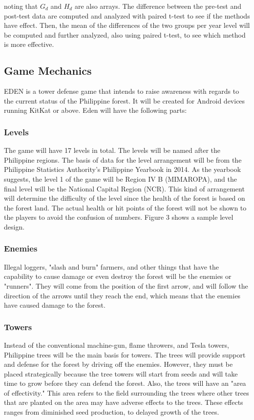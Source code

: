\documentclass[journal]{./IEEE/IEEEtran}
\begin{document}
noting that $G_d$ and $H_d$ are also arrays. The difference between the pre-test and post-test data are computed and analyzed with paired t-test to see if the methods have effect. Then, the mean of the differences of the two groups per year level will be computed and further analyzed, also using paired t-test, to see which method is more effective.


\subsection{Game Mechanics}
EDEN is a tower defense game that intends to raise awareness with regards to the current status of the Philippine forest. It will be created for Android devices running KitKat or above. Eden will have the following parts:

\subsubsection{Levels}
The game will have 17 levels in total. The levels will be named after the Philippine regions. The basis of data for the level arrangement will be from the Philippine Statistics Authority's Philippine Yearbook in 2014. As the yearbook suggests, the level 1 of the game will be Region IV B (MIMAROPA), and the final level will be the National Capital Region (NCR). This kind of arrangement will determine the difficulty of the level since the health of the forest is based on the forest land. The actual health or hit points of the forest will not be shown to the players to avoid the confusion of numbers. Figure 3 shows a sample level design.


\subsubsection{Enemies}
Illegal loggers, "slash and burn" farmers, and other things that have the capability to cause damage or even destroy the forest will be the enemies or "runners". They will come from the position of the first arrow, and will follow the direction of the arrows until they reach the end, which means that the enemies have caused damage to the forest.


\subsubsection{Towers}
Instead of the conventional machine-gun, flame throwers, and Tesla towers, Philippine trees will be the main basis for towers. The trees will provide support and defense for the forest by driving off the enemies. However, they must be placed strategically because the tree towers will start from seeds and will take time to grow before they can defend the forest. Also, the trees will have an "area of effectivity." This area refers to the field surrounding the trees where other trees that are planted on the area may have adverse effects to the trees. These effects ranges from diminished seed production, to delayed growth of the trees.
\end{document}
